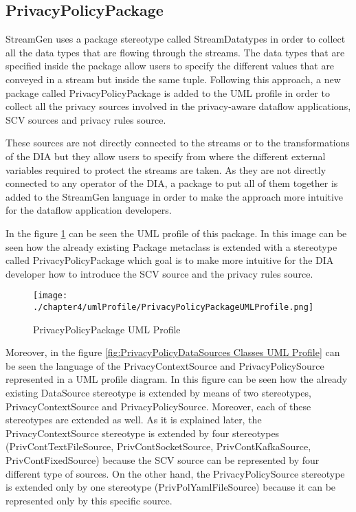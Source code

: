 \subsection{PrivacyPolicyPackage}

StreamGen uses a package stereotype called StreamDatatypes in order to collect all the data types that are flowing through the streams. The data types that are specified inside the package allow users to specify the different values that are conveyed in a stream but inside the same tuple. Following this approach, a new package called PrivacyPolicyPackage is added to the UML profile in order to collect all the privacy sources involved in the privacy-aware dataflow applications, SCV sources and privacy rules source.

These sources are not directly connected to the streams or to the transformations of the DIA but they allow users to specify from where the different external variables required to protect the streams are taken. As they are not directly connected to any operator of the DIA, a package to put all of them together is added to the StreamGen language in order to make the approach more intuitive for the dataflow application developers.

In the figure \ref{fig:PrivacyPolicyPackage UML Profile} can be seen the UML profile of this package. In this image can be seen how the already existing Package metaclass is extended with a stereotype called PrivacyPolicyPackage which goal is to make more intuitive for the DIA developer how to introduce the SCV source and the privacy rules source.

\begin{figure}
\centering
{\texttt{[image: ./chapter4/umlProfile/PrivacyPolicyPackageUMLProfile.png]}}
\caption{PrivacyPolicyPackage UML Profile}
\label{fig:PrivacyPolicyPackage UML Profile}
\end{figure}

Moreover, in the figure \ref{fig:PrivacyPolicyDataSources Classes UML Profile} can be seen the language of the PrivacyContextSource and PrivacyPolicySource represented in a UML profile diagram. In this figure can be seen how the already existing DataSource stereotype is extended by means of two stereotypes, PrivacyContextSource and PrivacyPolicySource. Moreover, each of these stereotypes are extended as well. As it is explained later, the PrivacyContextSource stereotype is extended by four stereotypes (PrivContTextFileSource, PrivContSocketSource, PrivContKafkaSource, PrivContFixedSource) because the SCV source can be represented by four different type of sources. On the other hand, the PrivacyPolicySource stereotype is extended only by one stereotype (PrivPolYamlFileSource) because it can be represented only by this specific source.

